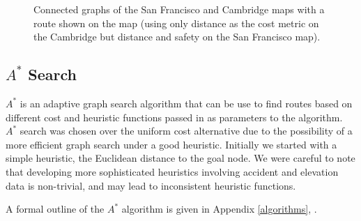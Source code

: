 \documentclass[11pt]{article}
\begin{document}
\begin{figure}%
    \centering
    \qquad
    \caption{Connected graphs of the San Francisco and Cambridge maps with a route shown on the map (using only distance as the cost metric on the Cambridge but distance and safety on the San Francisco map).}
    \label{connected_graphs}%
\end{figure}

\subsection{$A^{*}$ Search}
$A^{*}$ is an adaptive graph search algorithm that can be use to find routes based on different cost and heuristic functions passed in as parameters to the algorithm. $A^{*}$ search was chosen over the uniform cost alternative due to the possibility of a more efficient graph search under a good heuristic. Initially we started with a simple heuristic, the Euclidean distance to the goal node. We were careful to note that developing more sophisticated heuristics involving accident and elevation data is non-trivial, and may lead to inconsistent heuristic functions.\par
A formal outline of the $A^{*}$ algorithm is given in Appendix \ref{algorithms}, .
\end{document}
